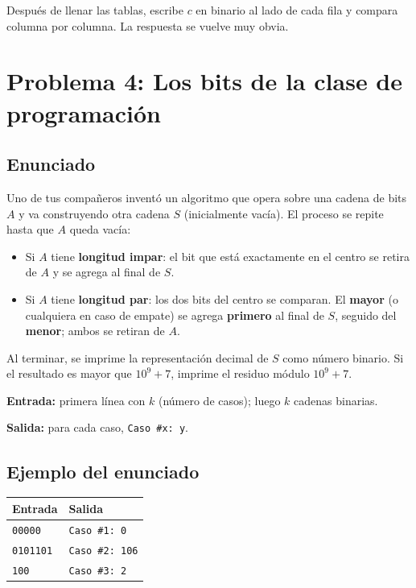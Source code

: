 \documentclass[12pt, oneside]{article}
\begin{document}
\vspace{1.5cm}

\begin{consejo}
  Después de llenar las tablas, escribe $c$ en binario al lado de cada fila y
  compara columna por columna.  La respuesta se vuelve muy obvia.
\end{consejo}

\newpage

\section{Problema 4: Los bits de la clase de programación}

\subsection{Enunciado}

Uno de tus compañeros inventó un algoritmo que opera sobre una cadena de bits
$A$ y va construyendo otra cadena $S$ (inicialmente vacía).  El proceso se
repite hasta que $A$ queda vacía:

\begin{itemize}
  \item Si $A$ tiene \textbf{longitud impar}: el bit que está exactamente en el
        centro se retira de $A$ y se agrega al final de $S$.
  \item Si $A$ tiene \textbf{longitud par}: los dos bits del centro se comparan.
        El \textbf{mayor} (o cualquiera en caso de empate) se agrega \textbf{primero}
        al final de $S$, seguido del \textbf{menor}; ambos se retiran de $A$.
\end{itemize}

Al terminar, se imprime la representación decimal de $S$ como número binario.
Si el resultado es mayor que $10^9+7$, imprime el residuo módulo $10^9+7$.

\textbf{Entrada:} primera línea con $k$ (número de casos); luego $k$ cadenas
binarias.

\textbf{Salida:} para cada caso, \texttt{Caso \#x: y}.

\subsection{Ejemplo del enunciado}

\begin{center}
\begin{tabular}{ll}
  \toprule
  \textbf{Entrada} & \textbf{Salida} \\
  \midrule
  \texttt{00000} & \texttt{Caso \#1: 0} \\
  \texttt{0101101} & \texttt{Caso \#2: 106} \\
  \texttt{100} & \texttt{Caso \#3: 2} \\
  \bottomrule
\end{tabular}
\end{center}
\end{document}
